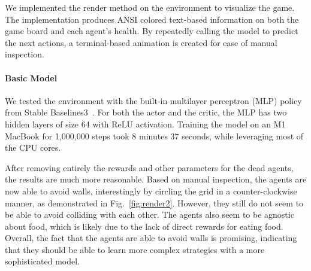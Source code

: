 \documentclass[conference]{IEEEtran}
\begin{document}
We implemented the \textsf{render}
method on the environment to visualize the game.
The implementation produces ANSI colored text-based information on both the game
board and each agent's health.
By repeatedly calling the model to predict the next actions,
a terminal-based animation is created for ease of manual inspection.

\paragraph{Basic Model}

We tested the environment with the built-in multilayer perceptron (MLP)
policy from Stable Baselines3~\cite{raffin2024stable}.
For both the actor and the critic,
the MLP has two hidden layers of size 64 with ReLU activation.
Training the model on an M1 MacBook for 1,000,000 steps took 8 minutes 37
seconds, while leveraging most of the CPU cores.

After removing entirely the rewards and other parameters for the dead agents,
the results are much more reasonable. Based on manual inspection,
the agents are now able to avoid walls,
interestingly by circling the grid in a counter-clockwise manner,
as demonstrated in Fig.~\ref{fig:render2}. However,
they still do not seem to be able to avoid colliding with each other.
The agents also seem to be agnostic about food,
which is likely due to the lack of direct rewards for eating food. Overall,
the fact that the agents are able to avoid walls is promising,
indicating that they should be able to learn more complex strategies with a more
sophisticated model.
\end{document}
